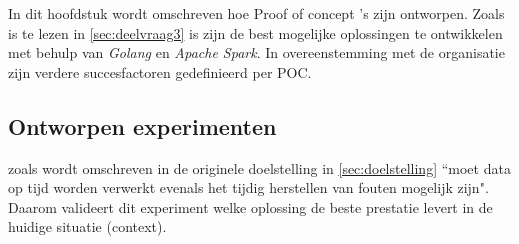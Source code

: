 


In dit hoofdstuk wordt omschreven hoe Proof of concept 's zijn ontworpen. Zoals is te lezen in \ref{sec:deelvraag3} is zijn de best mogelijke oplossingen te ontwikkelen met behulp van \textit{Golang} en \textit{Apache Spark}. In overeenstemming met de organisatie zijn verdere succesfactoren gedefinieerd per POC.




\subsection{Ontworpen experimenten}

zoals wordt omschreven in de originele doelstelling in \ref{sec:doelstelling} ``moet data op tijd worden verwerkt evenals het tijdig herstellen van fouten mogelijk zijn".  Daarom valideert dit experiment welke oplossing de beste prestatie levert in de huidige situatie (context).

